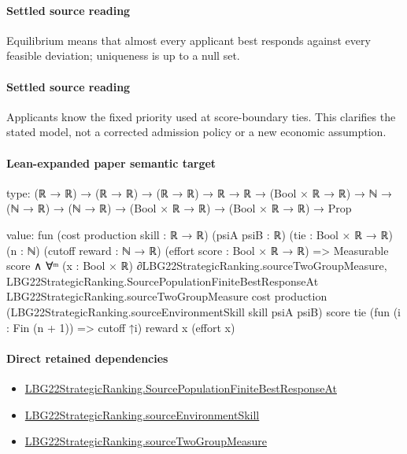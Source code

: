 \documentclass[10pt]{article}
\begin{document}
\paragraph{Settled source reading}
\begin{sloppypar}
Equilibrium means that almost every applicant best responds against every feasible deviation;\allowbreak{} uniqueness is up to a null set.\allowbreak{}
\end{sloppypar}
\paragraph{Settled source reading}
\begin{sloppypar}
Applicants know the fixed priority used at score-\allowbreak{}boundary ties.\allowbreak{} This clarifies the stated model, not a corrected admission policy or a new economic assumption.\allowbreak{}
\end{sloppypar}

\paragraph{Lean-expanded paper semantic target}
\begin{ReviewVerbatim}
type:
(ℝ → ℝ) → (ℝ → ℝ) → (ℝ → ℝ) → ℝ → ℝ → (Bool × ℝ → ℝ) → ℕ → (ℕ → ℝ) → (ℕ → ℝ) → (Bool × ℝ → ℝ) → (Bool × ℝ → ℝ) → Prop

value:
fun (cost production skill : ℝ → ℝ) (psiA psiB : ℝ) (tie : Bool × ℝ → ℝ) (n : ℕ) (cutoff reward : ℕ → ℝ)
    (effort score : Bool × ℝ → ℝ) =>
  Measurable score ∧
    ∀ᵐ (x : Bool × ℝ) ∂LBG22StrategicRanking.sourceTwoGroupMeasure,
      LBG22StrategicRanking.SourcePopulationFiniteBestResponseAt LBG22StrategicRanking.sourceTwoGroupMeasure cost
        production (LBG22StrategicRanking.sourceEnvironmentSkill skill psiA psiB) score tie
        (fun (i : Fin (n + 1)) => cutoff ↑i) reward x (effort x)
\end{ReviewVerbatim}

\paragraph{Direct retained dependencies}
\begin{itemize}\raggedright
\item \hyperlink{governing-declaration-418baddf0ad9374c}{LBG22\allowbreak{}Strategic\allowbreak{}Ranking.\allowbreak{}Source\allowbreak{}Population\allowbreak{}Finite\allowbreak{}Best\allowbreak{}Response\allowbreak{}At}
\item \hyperlink{paper-prerequisite-73413973c7594479}{LBG22\allowbreak{}Strategic\allowbreak{}Ranking.\allowbreak{}source\allowbreak{}Environment\allowbreak{}Skill}
\item \hyperlink{paper-prerequisite-5b3be494cde30a37}{LBG22\allowbreak{}Strategic\allowbreak{}Ranking.\allowbreak{}source\allowbreak{}Two\allowbreak{}Group\allowbreak{}Measure}
\end{itemize}
\end{document}
